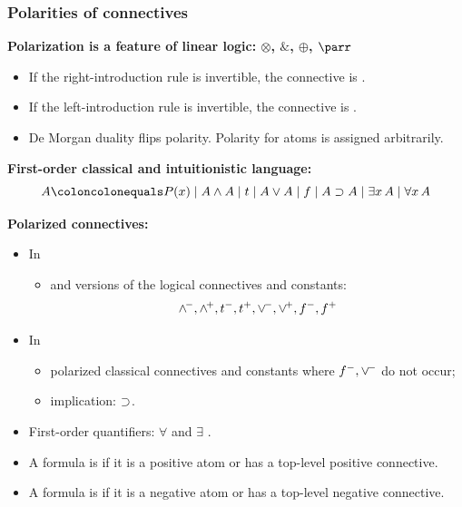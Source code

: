 \documentclass[9pt]{beamer}
\begin{document}
\begin{frame}
\frametitle{Polarities of connectives}

\textbf{{Polarization is a feature of linear logic: $\otimes$, $\&$,
    $\oplus$, $\parr$}}
\begin{itemize}
  \item If the right-introduction rule is invertible, the connective
    is .
  \item If the left-introduction rule is invertible, the connective
    is .
  \item De Morgan duality flips polarity.  Polarity for atoms is
    assigned arbitrarily.
\end{itemize}
\vfill
\pause

\textbf{First-order classical and intuitionistic language:}
$$A\coloncolonequals P(x) \mid A \wedge A \mid t \mid A \vee A 
        \mid f \mid A \impl A \mid \exists x\, A \mid \forall x\, A$$
\vfill

\textbf{{Polarized connectives:}}
\begin{itemize}
\item In %
\begin{itemize}
\item {} and  versions of the logical connectives and constants: 
\[\wedge^{\!-}, \wedge^{\!+}, t^-, t^+,\vee^{\!-}, \vee^{\!+}, f^-, f^+\]
\end{itemize}
\item In  
\begin{itemize}
\item polarized classical connectives and constants where $f^-,\vee^{\!-}$ do not occur;
\item {} implication: $\supset$.
\end{itemize}
\item First-order quantifiers: $\forall$  and $\exists$ .
\item A formula is  if it is a positive atom or has a
top-level positive connective.
\item A formula is  if it is a
negative atom or has a top-level negative connective.
\end{itemize}
\end{frame}
\end{document}
